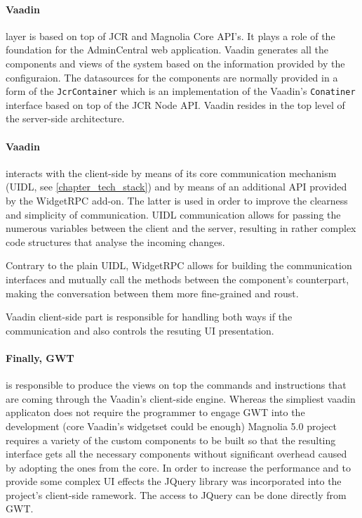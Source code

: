 \paragraph{Vaadin} layer is based on top of JCR and Magnolia Core API's. It
plays a role of the foundation for the AdminCentral web application. Vaadin
generates all the components and views of the system based on the information
provided by the configuraion. The datasources for the components are normally
provided in a form of the \texttt{JcrContainer} which is an implementation of
the Vaadin's \texttt{Conatiner} interface based on top of the JCR Node API.
Vaadin resides in the top level of the server-side architecture. 

\paragraph{Vaadin} interacts with the client-side by means of its core
communication mechanism (UIDL, see \ref{chapter_tech_stack}) and by means of an
additional API provided by the WidgetRPC add-on. The latter is used in order to
improve the clearness and simplicity of communication. UIDL
communication allows for passing the numerous variables between the client and
the server, resulting in rather complex code structures that analyse the
incoming changes.

Contrary to the plain UIDL, WidgetRPC allows for building the communication
interfaces and mutually call the methods between the component's counterpart,
making the conversation between them more fine-grained and roust.

Vaadin client-side part is responsible for handling both ways if the
communication and also controls the resuting UI presentation.

\paragraph{Finally, GWT} is responsible to produce the views on top the commands
and instructions that are coming through the Vaadin's client-side engine.
Whereas the simpliest vaadin applicaton does not require the programmer to engage
GWT into the development (core Vaadin's widgetset could be enough) Magnolia 5.0
project requires a variety of the custom components to be built so that the
resulting interface gets all the necessary components without significant
overhead caused by adopting the ones from the core. In order to increase the
performance and to provide some complex UI effects the JQuery library was
incorporated into the project's client-side ramework. The access to JQuery can
be done directly from GWT.
